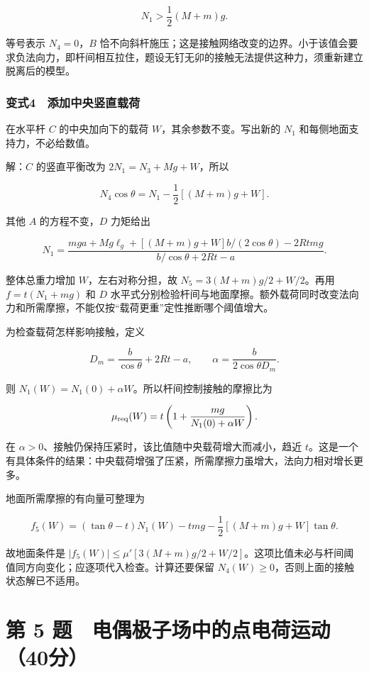 \documentclass[12pt,a4paper,fontset=fandol]{ctexart}
\begin{document}
\[N_1>\frac12(M+m)g.\]

等号表示 \(N_4=0\)，\(B\)
恰不向斜杆施压；这是接触网络改变的边界。小于该值会要求负法向力，即杆间相互拉住，题设无钉无卯的接触无法提供这种力，须重新建立脱离后的模型。

\subsubsection{变式4　添加中央竖直载荷}\label{ux53d8ux5f0f4-ux6dfbux52a0ux4e2dux592eux7ad6ux76f4ux8f7dux8377}

在水平杆 \(C\) 的中央加向下的载荷 \(W\)，其余参数不变。写出新的 \(N_1\)
和每侧地面支持力，不必给数值。

解：\(C\) 的竖直平衡改为 \(2N_1=N_3+Mg+W\)，所以

\[N_4\cos\theta=N_1-\frac12[(M+m)g+W].\]

其他 \(A\) 的方程不变，\(D\) 力矩给出

\[N_1=
\frac{mga+Mg\ell_g+[(M+m)g+W]b/(2\cos\theta)-2Rtmg}
{b/\cos\theta+2Rt-a}.\]

整体总重力增加 \(W\)，左右对称分担，故 \(N_5=3(M+m)g/2+W/2\)。再用
\(f=t(N_1+mg)\) 和 \(D\)
水平式分别检验杆间与地面摩擦。额外载荷同时改变法向力和所需摩擦，不能仅按``载荷更重''定性推断哪个阈值增大。

为检查载荷怎样影响接触，定义

\[D_m=\frac b{\cos\theta}+2Rt-a,\qquad
\alpha=\frac{b}{2\cos\theta D_m}.\]

则 \(N_1(W)=N_1(0)+\alpha W\)。所以杆间控制接触的摩擦比为

\[\mu_{\rm req}(W)
=t\left(1+\frac{mg}{N_1(0)+\alpha W}\right).\]

在 \(\alpha>0\)、接触仍保持压紧时，该比值随中央载荷增大而减小，趋近
\(t\)。这是一个有具体条件的结果：中央载荷增强了压紧，所需摩擦力虽增大，法向力相对增长更多。

地面所需摩擦的有向量可整理为

\[f_5(W)=(\tan\theta-t)N_1(W)-tmg
-\frac12[(M+m)g+W]\tan\theta.\]

故地面条件是
\(|f_5(W)|\le\mu'[3(M+m)g/2+W/2]\)。这项比值未必与杆间阈值同方向变化；应逐项代入检查。计算还要保留
\(N_4(W)\ge0\)，否则上面的接触状态解已不适用。

\clearpage

\section{第 5
题　电偶极子场中的点电荷运动（40分）}\label{ux7b2c-5-ux9898-ux7535ux5076ux6781ux5b50ux573aux4e2dux7684ux70b9ux7535ux8377ux8fd0ux52a840ux5206}
\end{document}
